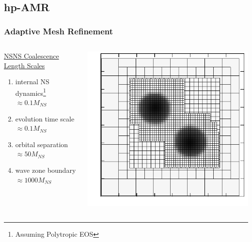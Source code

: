 \subsection{hp-AMR}
\begin{frame}
\frametitle{Adaptive Mesh Refinement}
\begin{columns}
  \begin{column}{.6\textwidth}
\begin{center}
\vspace{.5cm}
\setul{}{2pt}
\ul{NSNS Coalescence Length Scales}
\vspace{.3cm}
  \begin{enumerate}
  \item[\blacksquare] internal NS dynamics\footnote[frame]{\scriptsize Assuming Polytropic EOS} $\approx 0.1M_{NS}$ 
  \item[\blacksquare] evolution time scale $\approx 0.1M_{NS}$
  \item[\blacksquare] orbital separation $\approx 50M_{NS}$
  \item[\blacksquare] wave zone boundary $\approx 1000M_{NS}$
  \end{enumerate} 
\end{center}
\vspace{1cm}
  \end{column}
  \begin{column}{.35\textwidth} 
\begin{center}
\includegraphics[width=\textwidth]{pictures/ns_amr.pdf}
\vspace{-.15cm}   
\text{ \scriptsize [Evans et al; gr-qc/0501066]}
\end{center}
  \end{column}
\end{columns}

\end{frame}

